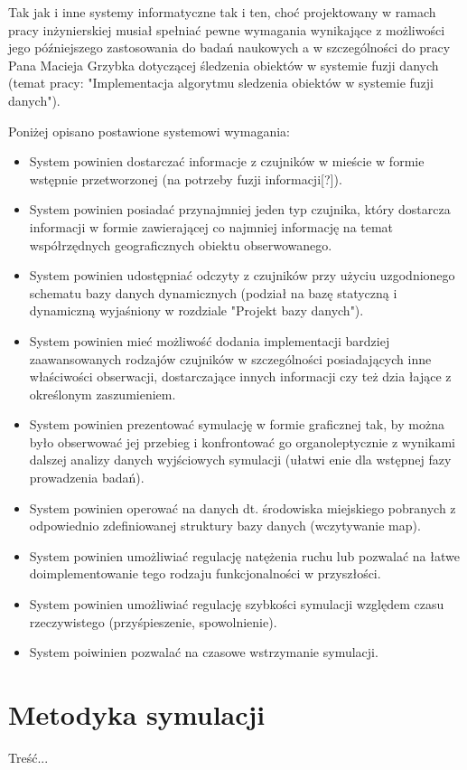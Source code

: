 \par{
Tak jak i inne systemy informatyczne tak i ten, choć projektowany w ramach pracy inżynierskiej musiał spełniać pewne wymagania wynikające z możliwości jego późniejszego zastosowania do badań naukowych a w szczególności do pracy Pana Macieja Grzybka dotyczącej śledzenia obiektów w systemie fuzji danych (temat pracy: "Implementacja algorytmu sledzenia obiektów w systemie fuzji danych").
}
\par{
Poniżej opisano postawione systemowi wymagania:
\begin{itemize}
	\item System powinien dostarczać informacje z czujników w mieście w formie wstępnie przetworzonej (na potrzeby fuzji informacji[?]).
	\item System powinien posiadać przynajmniej jeden typ czujnika, który dostarcza informacji w formie zawierającej co najmniej informację na temat współrzędnych geograficznych obiektu obserwowanego.
	\item System powinien udostępniać odczyty z czujników przy użyciu uzgodnionego schematu bazy danych dynamicznych (podział na bazę statyczną i dynamiczną wyjaśniony w rozdziale "Projekt bazy danych").
	\item System powinien mieć możliwość dodania implementacji bardziej zaawansowanych rodzajów czujników w szczególności posiadających inne właściwości obserwacji, dostarczające innych informacji czy też dzia    łające z określonym zaszumieniem.
	\item System powinien prezentować symulację w formie graficznej tak, by można było obserwować jej przebieg i konfrontować go organoleptycznie z wynikami dalszej analizy danych wyjściowych symulacji (ułatwi    enie dla wstępnej fazy prowadzenia badań).
	\item System powinien operować na danych dt. środowiska miejskiego pobranych z odpowiednio zdefiniowanej struktury bazy danych (wczytywanie map).
	\item System powinien umożliwiać regulację natężenia ruchu lub pozwalać na łatwe doimplementowanie tego rodzaju funkcjonalności w przyszłości.
	\item System powinien umożliwiać regulację szybkości symulacji względem czasu rzeczywistego (przyśpieszenie, spowolnienie).
	\item System poiwinien pozwalać na czasowe wstrzymanie symulacji.
\end{itemize}
}

\section[Metodyka symulacji][Metodyka symulacji]{Metodyka symulacji}
\par{ Treść... }
